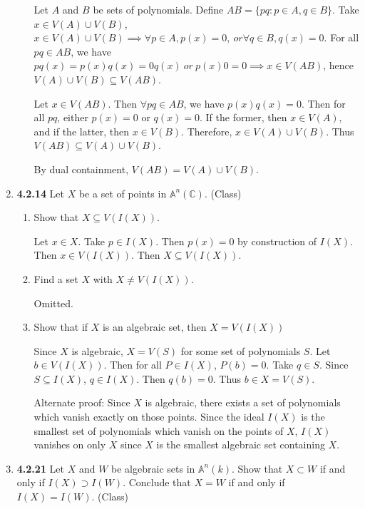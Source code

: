 \documentclass[12pt]{article}
\newcommand{\C}{\mathbb{C}}
\newcommand{\A}{\mathbb{A}}
\begin{document}
\begin{enumerate}
\begin{enumerate}
 Let $A$ and $B$ be sets of polynomials.  Define $AB=\{pq: p\in A, q\in B\}$.  Take $x\in V(A)\cup V(B)$, $x\in V(A)\cup V(B) \implies \forall p\in A, p(x)=0,~ or\forall q\in B, q(x)=0$.  For all $pq\in AB$, we have $pq(x)=p(x)q(x) = 0q(x)~or~p(x)0 = 0 \implies x\in V(AB)$, hence $V(A)\cup V(B) \subseteq V(AB)$.
 
 Let $x\in V(AB)$.  Then $\forall pq\in AB$, we have $p(x)q(x)=0$.  Then for all $pq$, either $p(x)=0$ or $q(x)=0$.  If the former, then $x\in V(A)$, and if the latter, then $x\in V(B)$.  Therefore, $x\in V(A)\cup V(B)$.  Thus $V(AB)\subseteq V(A)\cup V(B)$.
 
 By dual containment, $V(AB)= V(A)\cup V(B)$.
 
 \end{enumerate}
    
	\item \textbf{4.2.14} Let $X$ be a set of points in $\A^n(\C)$. (Class)
	\begin{enumerate}
	\item Show that $X\subseteq V(I(X))$.
	
	Let $x\in X$.  Take $p\in I(X)$.  Then $p(x)=0$ by construction of $I(X)$.  Then $x\in V(I(X))$.  Then $X\subseteq V(I(X))$.
	
	\item Find a set $X$ with $X\neq V(I(X))$.
	
	Omitted.
	
	\item Show that if $X$ is an algebraic set, then $X=V(I(X))$	
	
	Since $X$ is algebraic, $X=V(S)$ for some set of polynomials $S$.  Let $b\in V(I(X))$.  Then for all $P\in I(X)$, $P(b)=0$.  Take $q\in S$.  Since $S\subseteq I(X)$, $q\in I(X)$.  Then $q(b)=0$.  Thus $b\in X = V(S)$.
	
	Alternate proof: Since $X$ is algebraic, there exists a set of polynomials which vanish exactly on those points.  Since the ideal $I(X)$ is the smallest set of polynomials which vanish on the points of $X$, $I(X)$ vanishes on only $X$ since $X$ is the smallest algebraic set containing $X$.
	
	\end{enumerate}
    
    \item \textbf{4.2.21} Let $X$ and $W$ be algebraic sets in $\A^n(k)$.  Show that $X\subset W$ if and only if $I(X)\supset I(W)$.  Conclude that $X=W$ if and only if $I(X)=I(W)$. (Class)
\end{enumerate}
\end{document}
